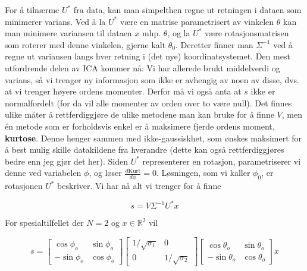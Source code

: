 For å tilnærme $U^*$ fra data, kan man simpelthen regne ut retningen i dataen som minimerer varians. Ved å la $U^*$ være en matrise parametrisert av vinkelen $\theta$ kan man minimere variansen til dataen $x$ mhp. $\theta$, og la $U^*$ være rotasjonsmatrisen som roterer med denne vinkelen, gjerne kalt $\theta_0$. Deretter finner man $\Sigma^{-1}$ ved å regne ut variansen langs hver retning i (det nye) koordinatsystemet. Den mest utfordrende delen av ICA kommer nå: Vi har allerede brukt middelverdi og varians, så vi trenger ny informasjon som ikke er avhengig av noen av disse, dvs. at vi trenger høyere ordens momenter. Derfor må vi også anta at $s$ ikke er normalfordelt (for da vil alle momenter av orden over to være null). Det finnes ulike måter å rettferdiggjøre de ulike metodene man kan bruke for å finne $V$, men én metode som er forholdsvis enkel er å maksimere fjerde ordens moment, \textbf{kurtose}. Denne henger sammen med ikke-gaussiskhet, som ønskes maksimert for å best mulig skille datakildene fra hverandre (dette kan også rettferdiggjøres bedre enn jeg gjør det her). Siden $U^*$ representerer en rotasjon, parametriserer vi denne ved variabelen $\phi$, og løser $\frac{d \textrm{Kurt}}{d \phi} = 0$. Løsningen, som vi kaller $\phi_0$, er rotasjonen $U^*$ beskriver. Vi har nå alt vi trenger for å finne

\begin{equation}
	s = V \Sigma^{-1} U^* x
\end{equation}

For spesialtilfellet der $N = 2$ og $x \in \mathbb{R}^2$ vil

\begin{equation}
	s=\left[\begin{array}{cc}
\cos \phi_{o} & \sin \phi_{o} \\
-\sin \phi_{o} & \cos \phi_{o}
\end{array}\right]\left[\begin{array}{cc}
1 / \sqrt{\sigma_{1}} & 0 \\
0 & 1 / \sqrt{\sigma_{2}}
\end{array}\right]\left[\begin{array}{cc}
\cos \theta_{o} & \sin \theta_{o} \\
-\sin \theta_{o} & \cos \theta_{o}
\end{array}\right] x
\end{equation}
